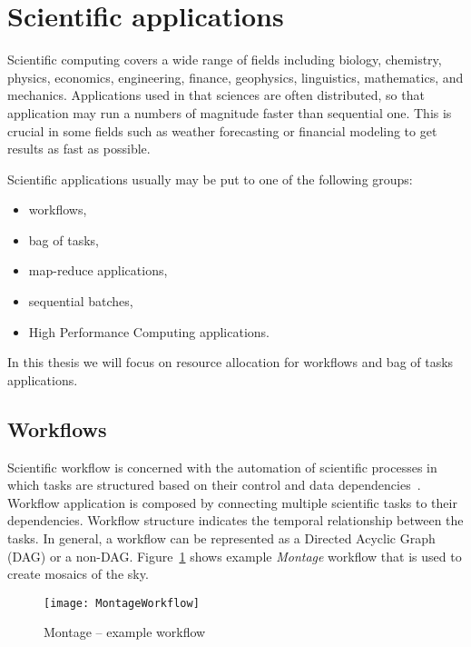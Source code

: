 \section{Scientific applications}
\label{intro:application}

Scientific computing covers a wide range of fields including biology, chemistry, physics, economics, engineering, finance, geophysics, linguistics, mathematics, and mechanics. Applications used in that sciences are often distributed, so that application may run a numbers of magnitude faster than sequential one. This is crucial in some fields such as weather forecasting or financial modeling to get results as fast as possible. 

Scientific applications usually may be put to one of the following groups: 
\begin{itemize}
  \item workflows,
  \item bag of tasks,
  \item map-reduce applications,  
  \item sequential batches,
  \item High Performance Computing applications.
\end{itemize}

In this thesis we will focus on resource allocation for workflows and bag of tasks applications.

\subsection{Workflows}
\label{intro:workflow}

Scientific workflow is concerned with the automation of scientific processes in which tasks are structured based on their control and data dependencies~\cite{Taylor:2006:WES:1196459}. Workflow application is composed by connecting multiple scientific tasks to their dependencies. Workflow structure indicates the temporal relationship between the tasks. In general, a workflow can be represented as a Directed Acyclic Graph (DAG) or a non-DAG. Figure~\ref{fig:intro:workflow} shows example \emph{Montage} workflow that is used to create mosaics of the sky.

\begin{figure}[tb]
   \centering
   \texttt{[image: MontageWorkflow]}  
   \caption{Montage – example workflow~\cite{Bharathi08}}
   \label{fig:intro:workflow}
\end{figure} 


